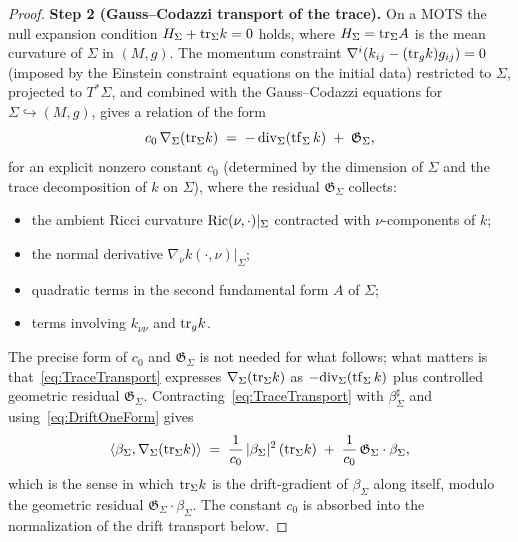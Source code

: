 \begin{proof}
\textbf{Step 2 (Gauss--Codazzi transport of the trace).}
On a MOTS the null expansion condition $H_\Sigma+\mathrm{tr}_\Sigma k=0$ holds, where $H_\Sigma=\mathrm{tr}_\Sigma A$ is the mean curvature of $\Sigma$ in $(M,g)$. The momentum constraint $\nabla^i(k_{ij}-(\mathrm{tr}_g k)g_{ij})=0$ (imposed by the Einstein constraint equations on the initial data) restricted to $\Sigma$, projected to $T^*\Sigma$, and combined with the Gauss--Codazzi equations for $\Sigma\hookrightarrow(M,g)$, gives a relation of the form
\begin{equation}\label{eq:TraceTransport}
    c_0\,\nabla_\Sigma(\mathrm{tr}_\Sigma k)\;=\;-\,\mathrm{div}_\Sigma(\mathrm{tf}_\Sigma\,k) \;+\; \mathfrak G_\Sigma ,
\end{equation}
for an explicit nonzero constant $c_0$ (determined by the dimension of $\Sigma$ and the trace decomposition of $k$ on $\Sigma$), where the residual $\mathfrak G_\Sigma$ collects:
\begin{itemize}
    \item the ambient Ricci curvature $\mathrm{Ric}(\nu,\cdot)|_\Sigma$ contracted with $\nu$-components of $k$;
    \item the normal derivative $\nabla_\nu k(\cdot,\nu)|_\Sigma$;
    \item quadratic terms in the second fundamental form $A$ of $\Sigma$;
    \item terms involving $k_{\nu\nu}$ and $\mathrm{tr}_g k$.
\end{itemize}
The precise form of $c_0$ and $\mathfrak G_\Sigma$ is not needed for what follows; what matters is that~\eqref{eq:TraceTransport} expresses $\nabla_\Sigma(\mathrm{tr}_\Sigma k)$ as $-\mathrm{div}_\Sigma(\mathrm{tf}_\Sigma\,k)$ plus controlled geometric residual $\mathfrak G_\Sigma$. Contracting~\eqref{eq:TraceTransport} with $\beta_\Sigma^\sharp$ and using~\eqref{eq:DriftOneForm} gives
\begin{equation}\label{eq:TraceDriftContract}
    \langle\beta_\Sigma,\nabla_\Sigma(\mathrm{tr}_\Sigma k)\rangle
    \;=\;
    \frac{1}{c_0}\,|\beta_\Sigma|^2\,(\mathrm{tr}_\Sigma k)
    \;+\;\frac{1}{c_0}\,\mathfrak G_\Sigma\cdot\beta_\Sigma ,
\end{equation}
which is the sense in which $\mathrm{tr}_\Sigma k$ is the drift-gradient of $\beta_\Sigma$ along itself, modulo the geometric residual $\mathfrak G_\Sigma\cdot\beta_\Sigma$. The constant $c_0$ is absorbed into the normalization of the drift transport below.


\end{proof}
